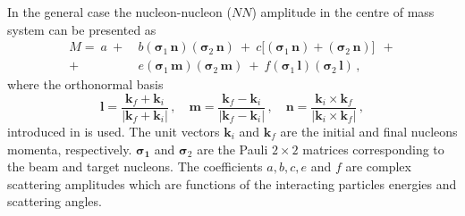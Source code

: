 \documentclass[twocolumn,epjc3]{svjour3}
\begin{document}
In the general case the nucleon-nucleon ($NN$) amplitude in the centre of mass
system can be presented as \cite{gla02}
\begin{equation}
  \label{eq:mat_full}
  \begin{split}
    M =\ a\ +\ &b
    (\boldsymbol{\sigma}_1\,\mathbf{n})
    (\boldsymbol{\sigma}_2\,\mathbf{n})\ +\ c\bigl[
    (\boldsymbol{\sigma}_1\,\mathbf{n}) +
    (\boldsymbol{\sigma}_2\,\mathbf{n})\bigr]\ \ + \\
    +\ &e
    (\boldsymbol{\sigma}_1\,\mathbf{m})
    (\boldsymbol{\sigma}_2\,\mathbf{m})\ +\ f
    (\boldsymbol{\sigma}_1\,\mathbf{l})
    (\boldsymbol{\sigma}_2\,\mathbf{l})\,,
  \end{split}
\end{equation}
where the orthonormal basis
\begin{equation}
  \mathbf{l} =
  \frac{\mathbf{k}_f + \mathbf{k}_i}{|\mathbf{k}_f + \mathbf{k}_i|}\,, \quad
  \mathbf{m} =
  \frac{\mathbf{k}_f - \mathbf{k}_i}{|\mathbf{k}_f - \mathbf{k}_i|}\,, \quad
  \mathbf{n} =
  \frac{\mathbf{k}_i \times \mathbf{k}_f}{|\mathbf{k}_i \times \mathbf{k}_f|}\,,
\end{equation}
introduced in \cite{gol66} is used. The unit vectors $\mathbf{k}_i$ and
$\mathbf{k}_f$ are the initial and final nucleons momenta, respectively.
$\boldsymbol{\sigma_1}$ and $\boldsymbol{\sigma}_2$ are the Pauli $2\times2$
matrices corresponding to the beam and target nucleons. The coefficients
$a, b, c, e$ and $f$ are complex scattering amplitudes which are functions of
the interacting particles energies and scattering angles.

\end{document}
